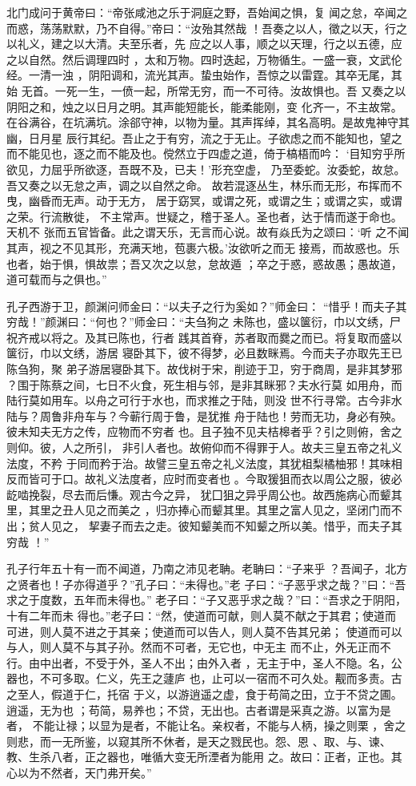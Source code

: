 \documentclass[12pt,UTF8]{ctexbook}
\begin{document}
北门成问于黄帝曰：“帝张咸池之乐于洞庭之野，吾始闻之惧，复 闻之怠，卒闻之而惑，荡荡默默，乃不自得。”帝曰：“汝殆其然哉 ！吾奏之以人，徵之以天，行之以礼义，建之以大清。夫至乐者，先 应之以人事，顺之以天理，行之以五德，应之以自然。然后调理四时 ，太和万物。四时迭起，万物循生。一盛一衰，文武伦经。一清一浊 ，阴阳调和，流光其声。蛰虫始作，吾惊之以雷霆。其卒无尾，其始 无首。一死一生，一偾一起，所常无穷，而一不可待。汝故惧也。吾 又奏之以阴阳之和，烛之以日月之明。其声能短能长，能柔能刚，变 化齐一，不主故常。在谷满谷，在坑满坑。涂郤守神，以物为量。其声挥绰，其名高明。是故鬼神守其幽，日月星 辰行其纪。吾止之于有穷，流之于无止。子欲虑之而不能知也，望之 而不能见也，逐之而不能及也。傥然立于四虚之道，倚于槁梧而吟： ‘目知穷乎所欲见，力屈乎所欲逐，吾既不及，已夫！’形充空虚， 乃至委蛇。汝委蛇，故怠。吾又奏之以无怠之声，调之以自然之命。 故若混逐丛生，林乐而无形，布挥而不曳，幽昏而无声。动于无方， 居于窈冥，或谓之死，或谓之生；或谓之实，或谓之荣。行流散徙， 不主常声。世疑之，稽于圣人。圣也者，达于情而遂于命也。天机不 张而五官皆备。此之谓天乐，无言而心说。故有焱氏为之颂曰：‘听 之不闻其声，视之不见其形，充满天地，苞裹六极。’汝欲听之而无 接焉，而故惑也。乐也者，始于惧，惧故祟；吾又次之以怠，怠故遁 ；卒之于惑，惑故愚；愚故道，道可载而与之俱也。”

孔子西游于卫，颜渊问师金曰：“以夫子之行为奚如？”师金曰： “惜乎！而夫子其穷哉！”颜渊曰：“何也？”师金曰：“夫刍狗之 未陈也，盛以箧衍，巾以文绣，尸祝齐戒以将之。及其已陈也，行者 践其首脊，苏者取而爨之而已。将复取而盛以箧衍，巾以文绣，游居 寝卧其下，彼不得梦，必且数眯焉。今而夫子亦取先王已陈刍狗，聚 弟子游居寝卧其下。故伐树于宋，削迹于卫，穷于商周，是非其梦邪 ？围于陈蔡之间，七日不火食，死生相与邻，是非其眯邪？夫水行莫 如用舟，而陆行莫如用车。以舟之可行于水也，而求推之于陆，则没 世不行寻常。古今非水陆与？周鲁非舟车与？今蕲行周于鲁，是犹推 舟于陆也！劳而无功，身必有殃。彼未知夫无方之传，应物而不穷者 也。且子独不见夫桔槔者乎？引之则俯，舍之则仰。彼，人之所引， 非引人者也。故俯仰而不得罪于人。故夫三皇五帝之礼义法度，不矜 于同而矜于治。故譬三皇五帝之礼义法度，其犹柤梨橘柚邪！其味相反而皆可于口。故礼义法度者，应时而变者也 。今取猨狙而衣以周公之服，彼必龁啮挽裂，尽去而后慊。观古今之异， 犹囗狙之异乎周公也。故西施病心而颦其里，其里之丑人见之而美之 ，归亦捧心而颦其里。其里之富人见之，坚闭门而不出；贫人见之， 挈妻子而去之走。彼知颦美而不知颦之所以美。惜乎，而夫子其穷哉 ！”

孔子行年五十有一而不闻道，乃南之沛见老聃。老聃曰：“子来乎 ？吾闻子，北方之贤者也！子亦得道乎？”孔子曰：“未得也。”老 子曰：“子恶乎求之哉？”曰：“吾求之于度数，五年而未得也。” 老子曰：“子又恶乎求之哉？”曰：“吾求之于阴阳，十有二年而未 得也。”老子曰：“然，使道而可献，则人莫不献之于其君；使道而 可进，则人莫不进之于其亲；使道而可以告人，则人莫不告其兄弟； 使道而可以与人，则人莫不与其子孙。然而不可者，无它也，中无主 而不止，外无正而不行。由中出者，不受于外，圣人不出；由外入者 ，无主于中，圣人不隐。名，公器也，不可多取。仁义，先王之蘧庐 也，止可以一宿而不可久处。觏而多责。古之至人，假道于仁，托宿 于义，以游逍遥之虚，食于苟简之田，立于不贷之圃。逍遥，无为也 ；苟简，易养也；不贷，无出也。古者谓是采真之游。以富为是者， 不能让禄；以显为是者，不能让名。亲权者，不能与人柄，操之则栗 ，舍之则悲，而一无所鉴，以窥其所不休者，是天之戮民也。怨、恩 、取、与、谏、教、生杀八者，正之器也，唯循大变无所湮者为能用 之。故曰：正者，正也。其心以为不然者，天门弗开矣。”
\end{document}
